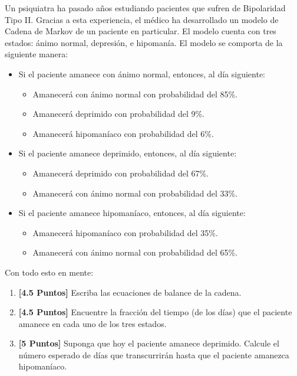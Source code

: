 \documentclass[ a4paper, twoside, 11pt]{article}
\begin{document}
\begin{problem}
Un psiquiatra ha pasado a\~nos estudiando pacientes que sufren de Bipolaridad Tipo II. Gracias a esta experiencia, el m\'edico ha desarrollado un modelo de Cadena de Markov de un paciente en particular. El modelo cuenta con tres estados: \'animo normal, depresi\'on, e hipoman\'ia. El modelo se comporta de la siguiente manera: 
\begin{itemize}
\item Si el paciente amanece con \'animo normal, entonces, al d\'ia siguiente: 
\begin{itemize}
\item Amanecer\'a con \'animo normal con probabilidad del 85\%. 
\item Amanecer\'a deprimido con probabilidad del 9\%. 
\item Amanecer\'a hipoman\'iaco con probabilidad del 6\%. 
\end{itemize}
\item Si el paciente amanece deprimido, entonces, al d\'ia siguiente: 
\begin{itemize}
\item Amanecer\'a deprimido con probabilidad del 67\%. 
\item Amanecer\'a con \'animo normal con probabilidad del 33\%. 
\end{itemize}
\item Si el paciente amanece hipoman\'iaco, entonces, al d\'ia siguiente: 
\begin{itemize}
\item Amanecer\'a hipoman\'iaco con probabilidad del 35\%. 
\item Amanecer\'a con \'animo normal con probabilidad del 65\%. 
\end{itemize}
\end{itemize}

Con todo esto en mente: 
\begin{enumerate}[label=\textbf{\alph*)}]
\item \textbf{[4.5 Puntos]} Escriba las ecuaciones de balance de la cadena. 
\item \textbf{[4.5 Puntos]} Encuentre la fracci\'on del tiempo (\ie de los d\'ias) que el paciente amanece en cada uno de los tres estados. 
\item \textbf{[5 Puntos]} Suponga que hoy el paciente amanece deprimido. Calcule el n\'umero esperado de d\'ias que transcurrir\'an hasta que el paciente amanezca hipoman\'iaco. 
\end{enumerate}
\QED

\end{problem}
\fullskip
\end{document}
